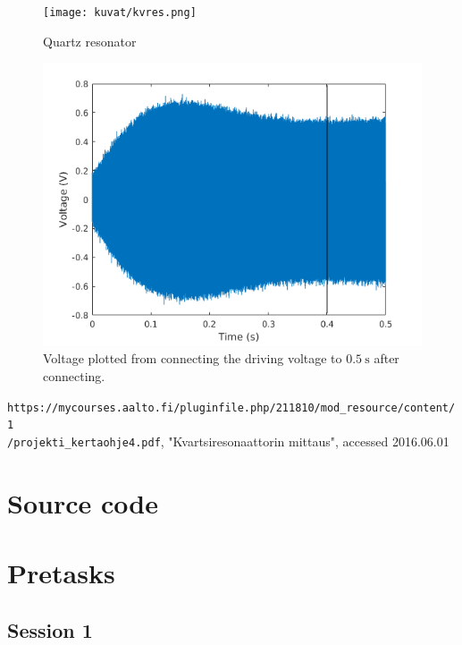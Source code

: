 \documentclass[12pt]{article}
\begin{document}
\begin{figure}
	\centering
	\texttt{[image: kuvat/kvres.png]}
	\caption{Quartz resonator}
	\label{fig:kvres}
\end{figure}

\begin{figure}[!ht]
	\centering
	\includegraphics[width = \textwidth]{kuvat/steadystate.png}
	\caption{Voltage plotted from connecting the driving voltage to $\SI{0.5}{\second}$ after connecting.}
	\label{fig:steady}
\end{figure}

\begin{thebibliography}{1}
 \texttt{https://mycourses.aalto.fi/pluginfile.php/211810/mod\_resource/content/1\\/projekti\_kertaohje4.pdf}, "Kvartsiresonaattorin mittaus", accessed 2016.06.01
\end{thebibliography}

\appendix

\section{Source code}


%

\section{Pretasks}

\subsection{Session 1}
\end{document}
